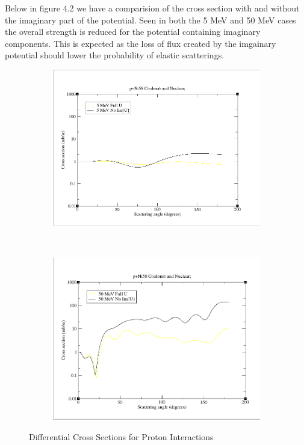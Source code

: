 \documentclass[paper=a4, fontsize=11pt]{scrartcl} %
\numberwithin{equation}{section} %
\numberwithin{figure}{section} %
\numberwithin{table}{section} %
\begin{document}
Below in figure 4.2 we have a comparision of the cross section with and without the imaginary part of the potential.  Seen in both the 5 MeV and 50 MeV cases the overall strength is reduced for the potential containing imaginary components.  This is expected as the loss of flux created by the imgainary potential should lower the probability of elastic scatterings.  

 \begin{figure}[hbt]
        \centering
        \begin{subfigure}[b!]{0.35\textwidth}
                \includegraphics[width=\textwidth]{5MeVUandNoUComp.PNG}
        \end{subfigure}%
        ~ %
\quad
        \begin{subfigure}[b!]{0.35\textwidth}
                \includegraphics[width=\textwidth]{50MeVnoUandUcomp.PNG}
        \end{subfigure}

        \caption{Differential Cross Sections for Proton Interactions}
\end{figure}
 
\end{document}
